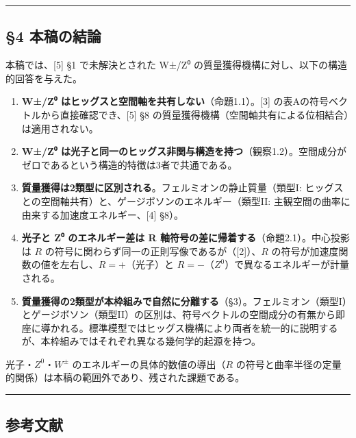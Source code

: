 \documentclass[
  a4paper,11pt]{ltjsarticle}
\theoremstyle{definition}
\theoremstyle{remark}
\begin{document}
\begin{center}\rule{0.5\linewidth}{0.5pt}\end{center}

\subsection{§4 本稿の結論}\label{ux672cux7a3fux306eux7d50ux8ad6}

本稿では、{[}5{]} §1 で未解決とされた W±/Z⁰
の質量獲得機構に対し、以下の構造的回答を与えた。

\begin{enumerate}
\def\labelenumi{\arabic{enumi}.}
\item
  \textbf{W±/Z⁰ はヒッグスと空間軸を共有しない}（命題1.1）。{[}3{]}
  の表Aの符号ベクトルから直接確認でき、{[}5{]} §8
  の質量獲得機構（空間軸共有による位相結合）は適用されない。
\item
  \textbf{W±/Z⁰
  は光子と同一のヒッグス非関与構造を持つ}（観察1.2）。空間成分がゼロであるという構造的特徴は3者で共通である。
\item
  \textbf{質量獲得は2類型に区別される}。フェルミオンの静止質量（類型I:
  ヒッグスとの空間軸共有）と、ゲージボソンのエネルギー（類型II:
  主観空間の曲率に由来する加速度エネルギー、{[}4{]} §8）。
\item
  \textbf{光子と Z⁰ のエネルギー差は R
  軸符号の差に帰着する}（命題2.1）。中心投影は \(R\)
  の符号に関わらず同一の正則写像であるが（{[}2{]}）、\(R\)
  の符号が加速度関数の値を左右し、\(R = +\)（光子）と
  \(R = -\)（\(Z^0\)）で異なるエネルギーが計量される。
\item
  \textbf{質量獲得の2類型が本枠組みで自然に分離する}（§3）。フェルミオン（類型I）とゲージボソン（類型II）の区別は、符号ベクトルの空間成分の有無から即座に導かれる。標準模型ではヒッグス機構により両者を統一的に説明するが、本枠組みではそれぞれ異なる幾何学的起源を持つ。
\end{enumerate}

光子・\(Z^0\)・\(W^{\pm}\) のエネルギーの具体的数値の導出（\(R\)
の符号と曲率半径の定量的関係）は本稿の範囲外であり、残された課題である。

\begin{center}\rule{0.5\linewidth}{0.5pt}\end{center}

\subsection{参考文献}\label{ux53c2ux8003ux6587ux732e}
\end{document}
